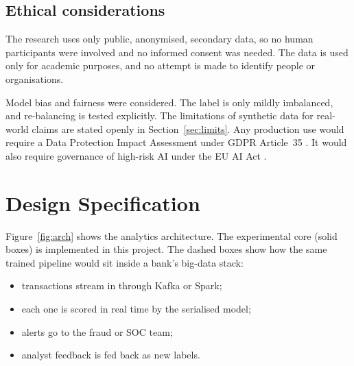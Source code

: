 \documentclass[12pt,a4paper]{article}
\begin{document}
\subsection{Ethical considerations}
The research uses only public, anonymised, secondary data, so no human participants were involved and no informed consent was needed. The data is used only for academic purposes, and no attempt is made to identify people or organisations.

Model bias and fairness were considered. The label is only mildly imbalanced, and re-balancing is tested explicitly. The limitations of synthetic data for real-world claims are stated openly in Section~\ref{sec:limits}. Any production use would require a Data Protection Impact Assessment under GDPR Article~35 \citep{gdpr2016}. It would also require governance of high-risk AI under the EU AI Act \citep{euaiact2024}.

\section{Design Specification}\label{sec:design}
Figure~\ref{fig:arch} shows the analytics architecture. The experimental core (solid boxes) is implemented in this project. The dashed boxes show how the same trained pipeline would sit inside a bank's big-data stack:
\begin{itemize}[nosep]
\item transactions stream in through Kafka or Spark;
\item each one is scored in real time by the serialised model;
\item alerts go to the fraud or SOC team;
\item analyst feedback is fed back as new labels.
\end{itemize}
\end{document}
